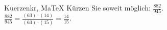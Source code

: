 \begin{MAufgabe}{Kuerzen}{kr, MaTeX}
K\"urzen Sie soweit m\"oglich: $\frac{882}{945}$.\\ 
\ifLsg\MLoesung
\quad $\frac{882}{945}=\frac{(63)\cdot(14)}{(63)\cdot(15)}=\frac{14}{15}$.\else\relax\fi
 \end{MAufgabe}
